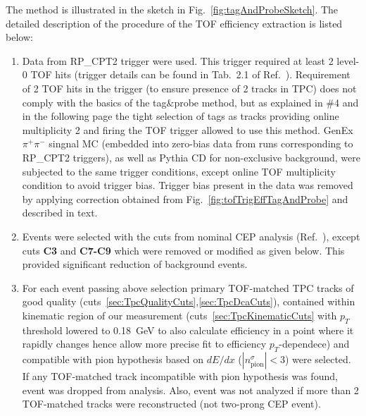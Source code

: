 The method is illustrated in the sketch in Fig.~\ref{fig:tagAndProbeSketch}. The detailed description of the procedure of the TOF efficiency extraction is listed below:
%
%
%
%
%
%
\begin{enumerate}
 \item Data from RP\_CPT2 trigger were used. This trigger required at least 2 level-0 TOF hits (trigger details can be found in Tab.~2.1 of Ref.~\cite{AnalysisNoteRafal}). Requirement of 2 TOF hits in the trigger (to ensure presence of 2 tracks in TPC) does not comply with the basics of the tag\&probe method, but as explained in \#4 and in the following page the tight selection of tags as tracks providing online multiplicity 2 and firing the TOF trigger allowed to use this method. GenEx $\pi^{+}\pi^{-}$ singnal MC (embedded into zero-bias data from runs corresponding to RP\_CPT2 triggers), as well as Pythia CD for non-exclusive background, were subjected to the same trigger conditions, except online TOF multiplicity condition to avoid trigger bias. Trigger bias present in the data was removed by applying correction obtained from Fig.~\ref{fig:tofTrigEffTagAndProbe} and described in text.\\[-20pt]%
 \item Events were selected with the cuts from nominal CEP analysis (Ref.~\cite{AnalysisNoteRafal}), except cuts \textbf{C3} and \textbf{C7-C9} which were removed or modified as given below. This provided significant reduction of background events.\\[-20pt]%
 \item For each event passing above selection primary TOF-matched TPC tracks of good quality (cuts~\ref{sec:TpcQualityCuts},\ref{sec:TpcDcaCuts}), contained within kinematic region of our measurement (cuts~\ref{sec:TpcKinematicCuts} with $p_{T}$ threshold lowered to 0.18~GeV to also calculate efficiency in a point where it rapidly changes hence allow more precise fit to efficiency $p_{T}$-dependece) and compatible with pion hypothesis based on $dE/dx$ ($|n^{\sigma}_{\text{pion}}|<3$) were selected. If any TOF-matched track incompatible with pion hypothesis was found, event was dropped from analysis. Also, event was not analyzed if more than 2 TOF-matched tracks were reconstructed (not two-prong CEP event).\\[-20pt]%

\end{enumerate}
